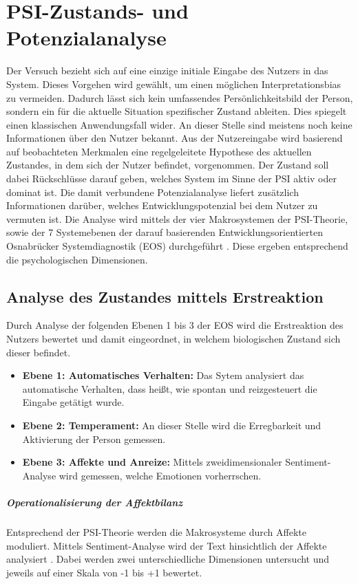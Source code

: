 \section{PSI-Zustands- und Potenzialanalyse}
Der Versuch bezieht sich auf eine einzige initiale Eingabe des Nutzers in das System. Dieses Vorgehen wird gewählt, um einen möglichen Interpretationsbias zu vermeiden. Dadurch lässt sich kein umfassendes Persönlichkeitsbild der Person, sondern ein für die aktuelle Situation spezifischer Zustand ableiten. Dies spiegelt einen klassischen Anwendungsfall wider. An dieser Stelle sind meistens noch keine Informationen über den Nutzer bekannt.
Aus der Nutzereingabe wird basierend auf beobachteten Merkmalen eine regelgeleitete Hypothese des aktuellen Zustandes, in dem sich der Nutzer befindet, vorgenommen. Der Zustand soll dabei Rückschlüsse darauf geben, welches System im Sinne der PSI aktiv oder dominat ist. Die damit verbundene Potenzialanalyse liefert zusätzlich Informationen darüber, welches Entwicklungspotenzial bei dem Nutzer zu vermuten ist. Die Analyse wird mittels der vier Makrosystemen der PSI-Theorie, sowie der 7 Systemebenen der darauf basierenden Entwicklungsorientierten Osnabrücker Systemdiagnostik (EOS) durchgeführt \citep{kuhl2005neue,kuhl2004systemdiagnostik}. Diese ergeben entsprechend die psychologischen Dimensionen. 

\subsection{Analyse des Zustandes mittels Erstreaktion}
Durch Analyse der folgenden Ebenen 1 bis 3 der EOS wird die Erstreaktion des Nutzers bewertet und damit eingeordnet, in welchem biologischen Zustand sich dieser befindet. 

\begin{itemize}
    \item \textbf{Ebene 1: Automatisches Verhalten:} Das Sytem analysiert das automatische Verhalten, dass heißt, wie spontan und reizgesteuert die Eingabe getätigt wurde.
    \item \textbf{Ebene 2: Temperament:} An dieser Stelle wird die Erregbarkeit und Aktivierung der Person gemessen.
    \item \textbf{Ebene 3: Affekte und Anreize:} Mittels zweidimensionaler Sentiment-Analyse wird gemessen, welche Emotionen vorherrschen.
\end{itemize}

\subparagraph{Operationalisierung der Affektbilanz}
Entsprechend der PSI-Theorie werden die Makrosysteme durch Affekte moduliert. Mittels Sentiment-Analyse wird der Text hinsichtlich der Affekte analysiert \citep{pang2008opinion}. Dabei werden zwei unterschiedliche Dimensionen untersucht und jeweils auf einer Skala von -1 bis +1 bewertet. 

